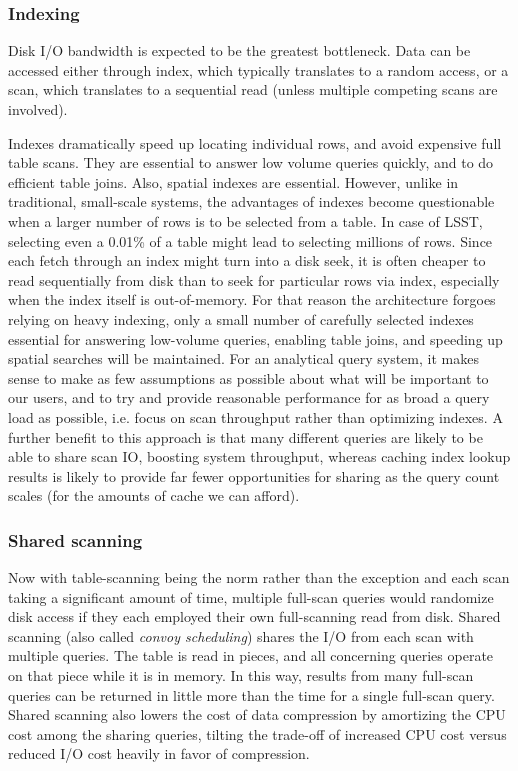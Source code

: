 \documentclass[DM,lsstdraft,toc]{lsstdoc}
\begin{document}
\subsubsection{Indexing}\label{indexing}

Disk I/O bandwidth is expected to be the greatest bottleneck. Data can
be accessed either through index, which typically translates to a random
access, or a scan, which translates to a sequential read (unless
multiple competing scans are involved).

Indexes dramatically speed up locating individual rows, and avoid
expensive full table scans. They are essential to answer low volume
queries quickly, and to do efficient table joins. Also, spatial indexes
are essential. However, unlike in traditional, small-scale systems, the
advantages of indexes become questionable when a larger number of rows
is to be selected from a table. In case of LSST, selecting even a 0.01\%
of a table might lead to selecting millions of rows. Since each fetch
through an index might turn into a disk seek, it is often cheaper to
read sequentially from disk than to seek for particular rows via index,
especially when the index itself is out-of-memory. For that reason the
architecture forgoes relying on heavy indexing, only a small number of
carefully selected indexes essential for answering low-volume queries,
enabling table joins, and speeding up spatial searches will be
maintained. For an analytical query system, it makes sense to make as
few assumptions as possible about what will be important to our users,
and to try and provide reasonable performance for as broad a query load
as possible, i.e. focus on scan throughput rather than optimizing
indexes. A further benefit to this approach is that many different
queries are likely to be able to share scan IO, boosting system
throughput, whereas caching index lookup results is likely to provide
far fewer opportunities for sharing as the query count scales (for the
amounts of cache we can afford).

\subsubsection{Shared scanning}\label{shared-scanning}

Now with table-scanning being the norm rather than the exception and
each scan taking a significant amount of time, multiple full-scan
queries would randomize disk access if they each employed their own
full-scanning read from disk. Shared scanning (also called \emph{convoy
scheduling}) shares the I/O from each scan with multiple queries. The
table is read in pieces, and all concerning queries operate on that
piece while it is in memory. In this way, results from many full-scan
queries can be returned in little more than the time for a single
full-scan query. Shared scanning also lowers the cost of data
compression by amortizing the CPU cost among the sharing queries,
tilting the trade-off of increased CPU cost versus reduced I/O cost
heavily in favor of compression.
\end{document}
